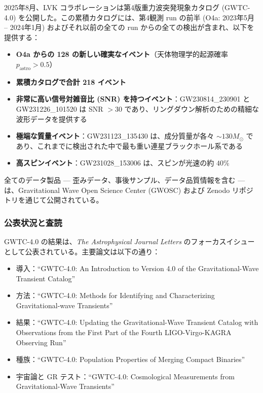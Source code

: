 \documentclass[11pt,a4paper]{article}
\theoremstyle{remark}
\begin{document}
	2025年8月、LVK コラボレーションは第4版重力波突発現象カタログ (GWTC-4.0) を公開した。この累積カタログには、第4観測 run の前半 (O4a: 2023年5月 – 2024年1月) およびそれ以前の全ての run からの全ての検出が含まれ、以下を提供する：
	
	\begin{itemize}
		\item \textbf{O4a からの 128 の新しい確実なイベント}（天体物理学的起源確率 $p_{\text{astro}} > 0.5$）
		\item \textbf{累積カタログで合計 218 イベント}
		\item \textbf{非常に高い信号対雑音比 (SNR) を持つイベント}：GW230814\_230901 と GW231226\_101520 は SNR $> 30$ であり、リングダウン解析のための精細な波形データを提供する
		\item \textbf{極端な質量イベント}：GW231123\_135430 は、成分質量が各々 $\sim 130 M_\odot$ であり、これまでに検出された中で最も重い連星ブラックホール系である
		\item \textbf{高スピンイベント}：GW231028\_153006 は、スピンが光速の約 $40\%$
	\end{itemize}
	
	全てのデータ製品 — 歪みデータ、事後サンプル、データ品質情報を含む — は、Gravitational Wave Open Science Center (GWOSC) および Zenodo リポジトリを通じて公開されている。
	
	\subsubsection{公表状況と査読}
	
	GWTC-4.0 の結果は、\textit{The Astrophysical Journal Letters} のフォーカスイシューとして公表されている。主要論文は以下の通り：
	
	\begin{itemize}
		\item 導入：``GWTC-4.0: An Introduction to Version 4.0 of the Gravitational-Wave Transient Catalog''
		\item 方法：``GWTC-4.0: Methods for Identifying and Characterizing Gravitational-wave Transients''
		\item 結果：``GWTC-4.0: Updating the Gravitational-Wave Transient Catalog with Observations from the First Part of the Fourth LIGO-Virgo-KAGRA Observing Run''
		\item 種族：``GWTC-4.0: Population Properties of Merging Compact Binaries''
		\item 宇宙論と GR テスト：``GWTC-4.0: Cosmological Measurements from Gravitational-Wave Transients''
	\end{itemize}
	
\end{document}

